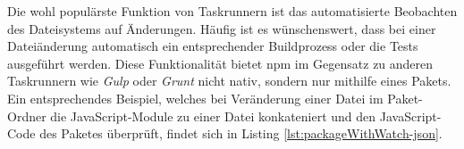 Die wohl populärste Funktion von Taskrunnern ist das automatisierte Beobachten des Dateisystems auf Änderungen. Häufig ist es wünschenswert, dass bei einer Dateiänderung automatisch ein entsprechender Buildprozess oder die Tests ausgeführt werden. Diese Funktionalität bietet npm im Gegensatz zu anderen Taskrunnern wie \textit{Gulp} oder \textit{Grunt} nicht nativ, sondern nur mithilfe eines Pakets. Ein entsprechendes Beispiel, welches bei Veränderung einer Datei im Paket-Ordner die JavaScript-Module zu einer Datei konkateniert\cite{browserify-about} und den JavaScript-Code des Paketes überprüft, findet sich in Listing \ref{lst:packageWithWatch-json}.\cite{cirkel-npmAsABuildTool}

\begin{figure}[H]
	
\end{figure}